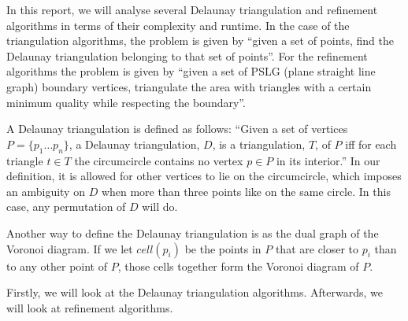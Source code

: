 In this report, we will analyse several Delaunay triangulation and refinement algorithms
in terms of their complexity and runtime.
In the case of the triangulation algorithms, the problem is given by ``given a set of points,
find the Delaunay triangulation belonging to that set of points''.
For the refinement algorithms the problem is given by ``given a set of PSLG (plane straight line graph)
boundary vertices, triangulate the area with triangles with a certain minimum quality while respecting the boundary''.

A Delaunay triangulation is defined as follows:
``Given a set of vertices $P = \{p_1 \ldots p_n\}$, a Delaunay triangulation, $D$, is a triangulation, $T$, of $P$
iff for each triangle $t \in T$ the circumcircle contains no vertex $p \in P$ in its interior.''
In our definition, it is allowed for other vertices to lie on the circumcircle, which imposes an ambiguity on $D$
when more than three points like on the same circle. In this case, any permutation of $D$ will do.

Another way to define the Delaunay triangulation is as the dual graph of the Voronoi diagram.
If we let $cell(p_i)$ be the points in $P$ that are closer to $p_i$ than to any other point of $P$,
those cells together form the Voronoi diagram of $P$.

Firstly, we will look at the Delaunay triangulation algorithms.
Afterwards, we will look at refinement algorithms.


